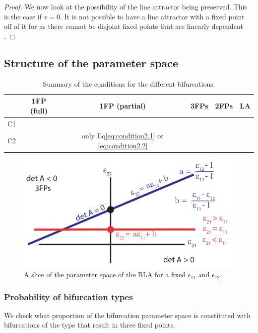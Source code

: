 \documentclass{article} %
\newcounter{ct}
\newcommand{\cmark}{\ding{51}}%
\newcommand{\xmark}{\ding{55}}%
\theoremstyle{definition}
\theoremstyle{remark}
\begin{document}
\begin{proof}
We now look at the possibility of the line attractor being preserved. 
This is the case if $v=0$.
It is not possible to have a line attractor with a fixed point off of it for as there cannot be disjoint fixed points that are linearly dependent \citep[Lemma 5.2]{morrison2016a}.
\end{proof}


\subsection{Structure of the parameter space}
\begin{table}[H]
\caption{Summary of the conditions for the different bifurcations.}\label{tab:bifs}
\centering
\bgroup
\def\arraystretch{1.52}
\begin{tabular}{|c||c|c|c|c|c|}
\hline
& 1FP (full) 		& 1FP (partial) & 3FPs & 2FPs & LA  \\\hline \hline
C1 & \cmark	 	& \xmark 	 & \cmark & \xmark & \xmark \\\hline 
C2 & \xmark 		& only Eq\ref{eq:condition2.1} or \ref{eq:condition2.2}  	 & \cmark & \cmark& \xmark \\\hline 
\end{tabular}
\egroup
\end{table}

\begin{figure}[H]
  \centering
  \includegraphics[width=\textwidth]{bla_parameter_space.pdf}
  \caption{A slice of the parameter space of the BLA for a fixed $\epsilon_{11}$ and $\epsilon_{12}$. %
  }
  \label{fig:blaparameterspace}
\end{figure}


\subsubsection{Probability of bifurcation types}
We check what proportion of the bifurcation parameter space is constituted with bifurcations of the type that result in three fixed points.
\end{document}
